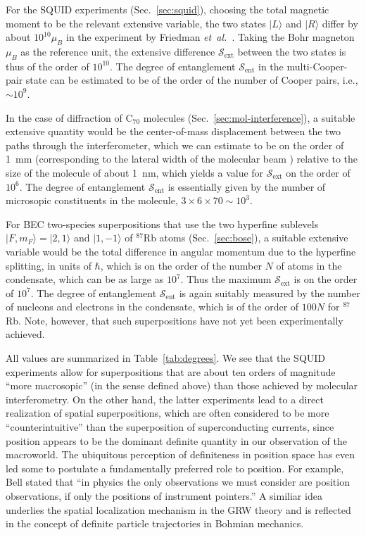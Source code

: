 \documentclass[12pt,aps,floatfix,amsmath,amssymb,showpacs,nofootinbib]{revtex4-2}
\newcommand{\etal}{\emph{et~al.\ }}
\newcommand{\ket}[1]{\ensuremath{|{#1\rangle}}}
\begin{document}
For the SQUID experiments (Sec.~\ref{sec:squid}), choosing the total
magnetic moment to be the relevant extensive variable, the two states
$\ket{L}$ and $\ket{R}$ differ by about $10^{10} \mu_B$ in the
experiment by Friedman \etal \cite{Friedman:2000:rr}. Taking the Bohr
magneton $\mu_B$ as the reference unit, the extensive difference
$\mathcal{S}_\text{ext}$ between the two states is thus of the order
of $10^{10}$. The degree of entanglement $\mathcal{S}_\text{ent}$ in
the multi-Cooper-pair state can be estimated to be of the order of the
number of Cooper pairs, i.e., $\sim 10^9$.

In the case of diffraction of C$_{70}$ molecules
(Sec.~\ref{sec:mol-interference}), a suitable extensive quantity would
be the center-of-mass displacement between the two paths through the
interferometer, which we can estimate to be on the order of 1~mm
(corresponding to the lateral width of the molecular beam
\cite{Hackermuller:2003:uu}) relative to the size of the molecule of
about 1~nm, which yields a value for $\mathcal{S}_\text{ext}$ on the
order of $10^6$. The degree of entanglement $\mathcal{S}_\text{ent}$
is essentially given by the number of microsopic constituents in the
molecule, $3 \times 6 \times 70 \sim 10^3$.

For BEC two-species superpositions that use the two hyperfine
sublevels $\ket{F,m_F} = \ket{2,1}$ and $\ket{1,-1}$ of $^{87}$Rb
atoms (Sec.~\ref{sec:bose}), a suitable extensive variable would be
the total difference in angular momentum due to the hyperfine
splitting, in units of $\hbar$, which is on the order of the number
$N$ of atoms in the condensate, which can be as large as $10^7$. Thus
the maximum $\mathcal{S}_\text{ext}$ is on the order of $10^7$. The
degree of entanglement $\mathcal{S}_\text{ent}$ is again suitably
measured by the number of nucleons and electrons in the condensate,
which is of the order of $100N$ for $^{87}$Rb. Note, however, that
such superpositions have not yet been experimentally achieved.
   
All values are summarized in Table~\ref{tab:degrees}. We see that the
SQUID experiments allow for superpositions that are about ten orders
of magnitude ``more macrosopic'' (in the sense defined above) than
those achieved by molecular interferometry. On the other hand, the
latter experiments lead to a direct realization of spatial
superpositions, which are often considered to be more
``counterintuitive'' than the superposition of superconducting
currents, since position appears to be the dominant definite quantity
in our observation of the macroworld. The ubiquitous perception of
definiteness in position space has even led some to postulate a
fundamentally preferred role to position. For example, Bell
\cite{Bell:1982:ag} stated that ``in physics the only observations we
must consider are position observations, if only the positions of
instrument pointers.'' A similiar idea underlies the spatial
localization mechanism in the GRW theory and is reflected in the
concept of definite particle trajectories in Bohmian mechanics.
\end{document}
